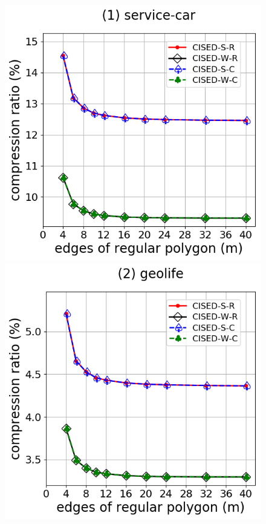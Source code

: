 {%


\begin{figure}[tb!]
\centering
\includegraphics[scale = 0.290]{Figures/Exp-M-e-60-CR-service.png}\hspace{1ex}
\includegraphics[scale = 0.290]{Figures/Exp-M-e-60-CR-geolife.png}\hspace{1ex}

\end{figure}}
